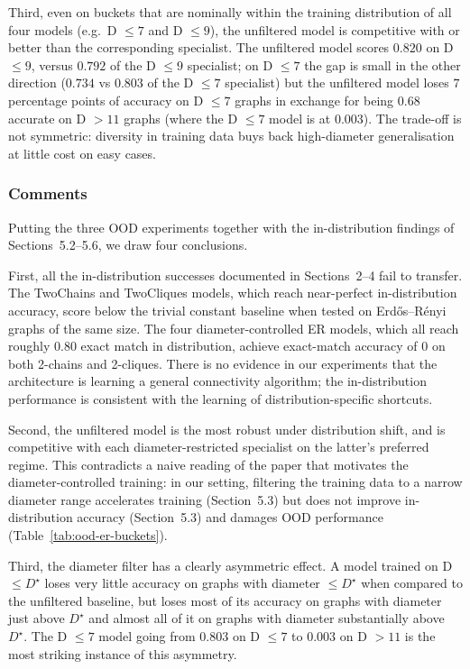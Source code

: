 \documentclass[11pt,a4paper]{article}
\begin{document}
Third, even on buckets that are nominally within the training distribution of all four models (e.g.\ D \(\le 7\) and D 
\(\le 9\)), the unfiltered model is competitive with or better than the corresponding specialist. The unfiltered model 
scores \(0.820\) on D \(\le 9\), versus \(0.792\) of the D \(\le 9\) specialist; on D \(\le 7\) the gap is small in the 
other direction (\(0.734\) vs \(0.803\) of the D \(\le 7\) specialist) but the unfiltered model loses \(7\) percentage 
points of accuracy on D \(\le 7\) graphs in exchange for being \(0.68\) accurate on D \(> 11\) graphs (where the D \(\le 7\) 
model is at \(0.003\)). The trade-off is not symmetric: diversity in training data buys back high-diameter generalisation at 
little cost on easy cases.

\subsubsection*{Comments}

Putting the three OOD experiments together with the in-distribution findings of Sections~5.2--5.6, we draw four conclusions.

First, all the in-distribution successes documented in Sections~2--4 fail to transfer. The TwoChains and TwoCliques models, 
which reach near-perfect in-distribution accuracy, score below the trivial constant baseline when tested on Erd\H{o}s--R\'enyi 
graphs of the same size. The four diameter-controlled ER models, which all reach roughly \(0.80\) exact match in distribution, 
achieve exact-match accuracy of \(0\) on both 2-chains and 2-cliques. There is no evidence in our experiments that the architecture
 is learning a general connectivity algorithm; the in-distribution performance is consistent with the learning of 
 distribution-specific shortcuts.

Second, the unfiltered model is the most robust under distribution shift, and is competitive with each diameter-restricted 
specialist on the latter's preferred regime. This contradicts a naive reading of the paper that motivates the 
diameter-controlled training: in our setting, filtering the training data to a narrow diameter range accelerates 
training (Section~5.3) but does not improve in-distribution accuracy (Section~5.3) and damages OOD performance 
(Table~\ref{tab:ood-er-buckets}).

Third, the diameter filter has a clearly asymmetric effect. A model trained on D \(\le D^\star\) loses very little
 accuracy on graphs with diameter \(\le D^\star\) when compared to the unfiltered baseline, but loses most of its 
 accuracy on graphs with diameter just above \(D^\star\) and almost all of it on graphs with diameter substantially 
 above \(D^\star\). The D \(\le 7\) model going from \(0.803\) on D \(\le 7\) to \(0.003\) on D \(> 11\) is the most 
 striking instance of this asymmetry.
\end{document}
